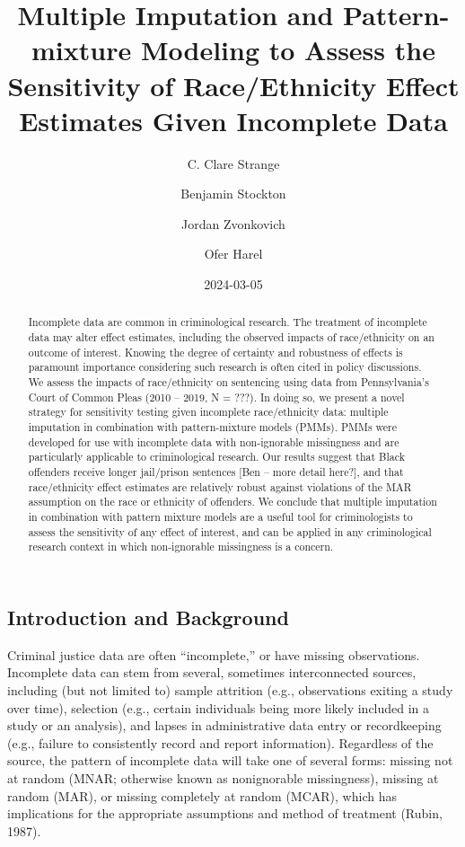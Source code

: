 \documentclass[
  letterpaper,
  DIV=11,
  numbers=noendperiod]{scrartcl}
\title{Multiple Imputation and Pattern-mixture Modeling to Assess the
Sensitivity of Race/Ethnicity Effect Estimates Given Incomplete Data}
\author{C. Clare Strange \and Benjamin Stockton \and Jordan
Zvonkovich \and Ofer Harel}
\date{2024-03-05}
\begin{document}
\maketitle
\begin{abstract}
Incomplete data are common in criminological research. The treatment of
incomplete data may alter effect estimates, including the observed
impacts of race/ethnicity on an outcome of interest. Knowing the degree
of certainty and robustness of effects is paramount importance
considering such research is often cited in policy discussions. We
assess the impacts of race/ethnicity on sentencing using data from
Pennsylvania's Court of Common Pleas (2010 -- 2019, N = ???). In doing
so, we present a novel strategy for sensitivity testing given incomplete
race/ethnicity data: multiple imputation in combination with
pattern-mixture models (PMMs). PMMs were developed for use with
incomplete data with non-ignorable missingness and are particularly
applicable to criminological research. Our results suggest that Black
offenders receive longer jail/prison sentences {[}Ben -- more detail
here?{]}, and that race/ethnicity effect estimates are relatively robust
against violations of the MAR assumption on the race or ethnicity of
offenders. We conclude that multiple imputation in combination with
pattern mixture models are a useful tool for criminologists to assess
the sensitivity of any effect of interest, and can be applied in any
criminological research context in which non-ignorable missingness is a
concern.
\end{abstract}
\ifdefined\Shaded\renewenvironment{Shaded}{\begin{tcolorbox}[interior hidden, breakable, borderline west={3pt}{0pt}{shadecolor}, boxrule=0pt, frame hidden, sharp corners, enhanced]}{\end{tcolorbox}}\fi

\hypertarget{introduction-and-background}{%
\subsection{Introduction and
Background}\label{introduction-and-background}}

Criminal justice data are often ``incomplete,'' or have missing
observations. Incomplete data can stem from several, sometimes
interconnected sources, including (but not limited to) sample attrition
(e.g., observations exiting a study over time), selection (e.g., certain
individuals being more likely included in a study or an analysis), and
lapses in administrative data entry or recordkeeping (e.g., failure to
consistently record and report information). Regardless of the source,
the pattern of incomplete data will take one of several forms: missing
not at random (MNAR; otherwise known as nonignorable missingness),
missing at random (MAR), or missing completely at random (MCAR), which
has implications for the appropriate assumptions and method of treatment
(Rubin, 1987).
\end{document}
